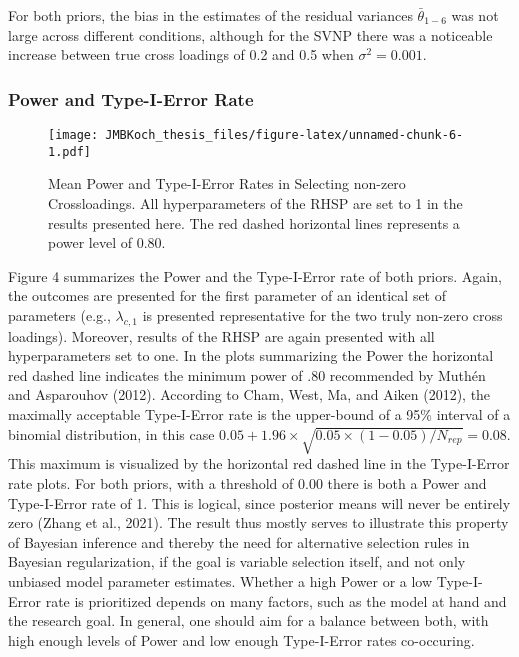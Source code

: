 \documentclass[
  man, donotrepeattitle,floatsintext]{apa6}
\begin{document}
For both priors, the bias in the estimates of the residual variances
\(\bar{\theta}_{1-6}\) was not large across different conditions, although
for the SVNP there was a noticeable increase between true cross loadings
of 0.2 and 0.5 when \(\sigma^2 = 0.001\).

\hypertarget{power-and-type-i-error-rate-1}{%
\subsubsection{Power and Type-I-Error Rate}\label{power-and-type-i-error-rate-1}}

\begin{figure}
\centering
\texttt{[image: JMBKoch\_thesis\_files/figure-latex/unnamed-chunk-6-1.pdf]}
\caption{\label{fig:unnamed-chunk-6}Mean Power and Type-I-Error Rates in Selecting non-zero Crossloadings. All hyperparameters of the RHSP are set to 1 in the results presented here. The red dashed horizontal lines represents a power level of 0.80.}
\end{figure}

Figure 4 summarizes the Power and the Type-I-Error rate of both priors.
Again, the outcomes are presented for the first parameter of an
identical set of parameters (e.g., \(\lambda_{c,1}\) is presented
representative for the two truly non-zero cross loadings). Moreover,
results of the RHSP are again presented with all hyperparameters set to
one. In the plots summarizing the Power the horizontal red dashed line
indicates the minimum power of .80 recommended by Muthén and Asparouhov (2012).
According to Cham, West, Ma, and Aiken (2012), the maximally acceptable
Type-I-Error rate is the upper-bound of a 95\% interval of a binomial
distribution, in this case
\(0.05 + 1.96 \times \sqrt{0.05 \times (1-0.05)/ N_{rep}} = 0.08\). This
maximum is visualized by the horizontal red dashed line in the
Type-I-Error rate plots. For both priors, with a threshold of 0.00 there
is both a Power and Type-I-Error rate of 1. This is logical, since
posterior means will never be entirely zero (Zhang et al., 2021). The
result thus mostly serves to illustrate this property of Bayesian
inference and thereby the need for alternative selection rules in
Bayesian regularization, if the goal is variable selection itself, and
not only unbiased model parameter estimates. Whether a high Power or a
low Type-I-Error rate is prioritized depends on many factors, such as
the model at hand and the research goal. In general, one should aim for
a balance between both, with high enough levels of Power and low enough
Type-I-Error rates co-occuring.
\end{document}
